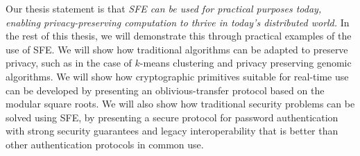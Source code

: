 Our thesis statement is that {\it SFE can be used for practical purposes today,
enabling privacy-preserving computation to thrive in today's distributed
world. } In the rest of this thesis, we will demonstrate this through
practical examples of the use of SFE.  We will show how traditional algorithms
can be adapted to preserve privacy, such as in the case of $k$-means clustering
and privacy preserving genomic algorithms.  We will show how cryptographic
primitives suitable for real-time use can be developed by presenting an
oblivious-transfer protocol based on the modular square roots.  We will
also show how traditional security problems can be solved using SFE,
by presenting a secure protocol for password authentication with strong
security guarantees and legacy interoperability that is better than other
authentication protocols in common use.

